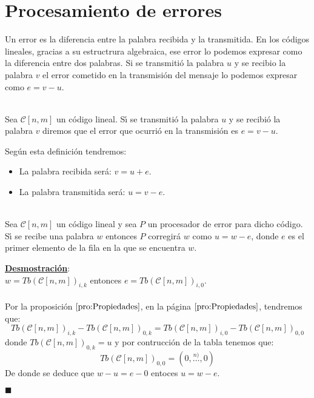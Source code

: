 %
%

\section{Procesamiento de errores}

Un error es la diferencia entre la palabra recibida y la transmitida. En los
c\'odigos lineales, gracias a su estructrura algebraica, ese error lo podemos
expresar como la diferencia entre dos palabras. Si se transmiti\'o la palabra
$u$ y se recibio la palabra $v$ el error cometido en la transmisi\'on del
mensaje lo podemos expresar como $e=v-u$.
\begin{definicion}
\ \\
Sea $\mathcal{C}[n,m]$ un c\'odigo lineal. S\'{\i} se transmiti\'o la palabra
$u$ y se recibi\'o la palabra $v$ diremos que el error que ocurri\'o en la
transmisi\'on es $e=v-u$.
\end{definicion}
Seg\'un esta definici\'on tendremos:
\begin{itemize}
\item La palabra recibida ser\'a: $v=u+e$.
\item La palabra transmitida ser\'a: $u=v-e$.
\end{itemize}
%
%
\begin{proposicion} \label{pro:ProcesarError}
\ \\
Sea $\mathcal{C}[n,m]$ un c\'odigo lineal y sea $P$ un procesador de error para
dicho c\'odigo. S\'{\i} se recibe una palabra $w$ entonces $P$ corregir\'a $w$
como $u=w-e$, donde $e$ es el primer elemento de la fila en la que se encuentra
$w$.
\end{proposicion}
\underline{\textbf{Desmostraci\'on}}:\\
$w=Tb(\mathcal{C}[n,m])_{i,k}$ entonces $e=Tb(\mathcal{C}[n,m])_{i,0}$.\\ \\
%
Por la proposici\'on $\ref{pro:Propiedades}$, en la p\'agina
$\pageref{pro:Propiedades}$, tendremos que:
\begin{displaymath}
Tb(\mathcal{C}[n,m])_{i,k}-Tb(\mathcal{C}[n,m])_{0,k}=
Tb(\mathcal{C}[n,m])_{i,0}-Tb(\mathcal{C}[n,m])_{0,0}
\end{displaymath}
donde $Tb(\mathcal{C}[n,m])_{0,k} = u$ y por contrucci\'on de la tabla tenemos
que: $$Tb(\mathcal{C}[n,m])_{0,0} = (0,\stackrel{n)}\dots,0)$$
De donde se deduce que $w-u=e-0$ entoces $u=w-e$.
\begin{flushright}
$\blacksquare$
\end{flushright}
